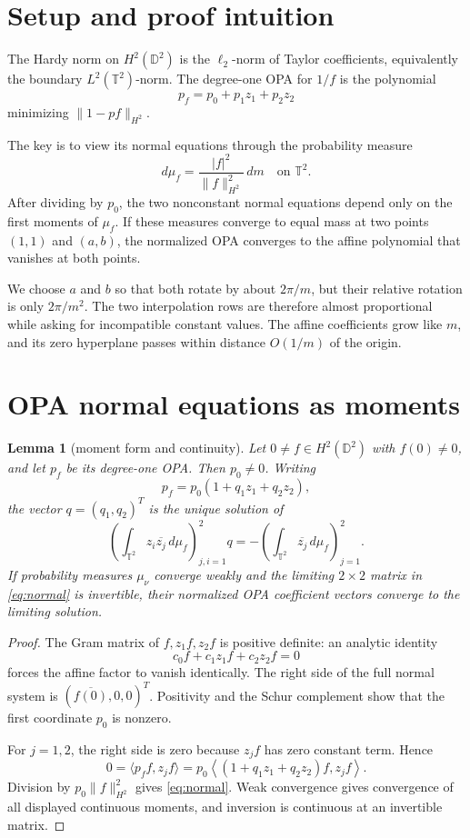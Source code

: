 \documentclass[11pt]{article}
\newtheorem{lemma}[theorem]{Lemma}
\newcommand{\D}{\mathbb D}
\newcommand{\T}{\mathbb T}
\begin{document}
\section{Setup and proof intuition}

The Hardy norm on \(H^2(\D^2)\) is the \(\ell_2\)-norm of Taylor
coefficients, equivalently the boundary \(L^2(\T^2)\)-norm. The degree-one
OPA for \(1/f\) is the polynomial
\[
 p_f=p_0+p_1z_1+p_2z_2
\]
minimizing \(\|1-pf\|_{H^2}\).

The key is to view its normal equations through the probability measure
\[
 d\mu_f=\frac{|f|^2}{\|f\|_{H^2}^2}\,dm
 \quad\text{on }\T^2.
\]
After dividing by \(p_0\), the two nonconstant normal equations depend only
on the first moments of \(\mu_f\). If these measures converge to equal mass
at two points \((1,1)\) and \((a,b)\), the normalized OPA converges to the
affine polynomial that vanishes at both points.

We choose \(a\) and \(b\) so that both rotate by about \(2\pi/m\), but their
relative rotation is only \(2\pi/m^2\). The two interpolation rows are
therefore almost proportional while asking for incompatible constant
values. The affine coefficients grow like \(m\), and its zero hyperplane
passes within distance \(O(1/m)\) of the origin.

\section{OPA normal equations as moments}

\begin{lemma}[moment form and continuity]\label{lem:moment}
Let \(0\ne f\in H^2(\D^2)\) with \(f(0)\ne0\), and let \(p_f\) be its
degree-one OPA. Then \(p_0\ne0\). Writing
\[
 p_f=p_0(1+q_1z_1+q_2z_2),
\]
the vector \(q=(q_1,q_2)^T\) is the unique solution of
\begin{equation}\label{eq:normal}
 \left(\int_{\T^2} z_i\overline{z_j}\,d\mu_f\right)_{j,i=1}^2 q
 =
 -\left(\int_{\T^2}\overline{z_j}\,d\mu_f\right)_{j=1}^2.
\end{equation}
If probability measures \(\mu_\nu\) converge weakly and the limiting
\(2\times2\) matrix in \eqref{eq:normal} is invertible, their normalized OPA
coefficient vectors converge to the limiting solution.
\end{lemma}

\begin{proof}
The Gram matrix of \(f,z_1f,z_2f\) is positive definite: an analytic
identity
\[
 c_0f+c_1z_1f+c_2z_2f=0
\]
forces the affine factor to vanish identically. The right side of the full
normal system is \((\overline{f(0)},0,0)^T\). Positivity and the Schur
complement show that the first coordinate \(p_0\) is nonzero.

For \(j=1,2\), the right side is zero because \(z_jf\) has zero constant
term. Hence
\[
 0=\langle p_ff,z_jf\rangle
 =p_0\left\langle(1+q_1z_1+q_2z_2)f,z_jf\right\rangle.
\]
Division by \(p_0\|f\|_{H^2}^2\) gives \eqref{eq:normal}. Weak convergence
gives convergence of all displayed continuous moments, and inversion is
continuous at an invertible matrix.
\end{proof}
\end{document}
